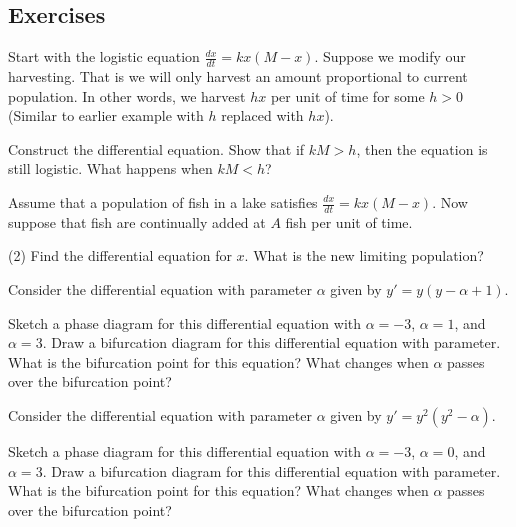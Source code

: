 \subsection{Exercises}

\begin{exercise}
Start with the logistic equation
$\frac{dx}{dt} = kx(M-x)$.
Suppose we modify our harvesting.  That is we will only harvest 
an amount proportional to current population.  In other words, we harvest $hx$
per unit of time
for some $h > 0$ (Similar to earlier example with $h$ replaced with $hx$).
\begin{tasks}
\task Construct the differential equation. 
\task Show that if $kM > h$, then
the equation is still logistic.
\task What happens when $kM < h$?
\end{tasks}
\end{exercise}

\begin{exercise}\ansMark
Assume that a population of fish in a lake satisfies
$\frac{dx}{dt} = kx(M-x)$.  Now suppose that fish are continually added
at $A$ fish per unit of time.
\begin{tasks}(2)
\task Find the differential equation for $x$.
\task What is the new limiting population?
\end{tasks}
\end{exercise}

\begin{exercise}
Consider the differential equation with parameter $\alpha$ given by $y' = y(y - \alpha + 1)$. 
\begin{tasks}
\task Sketch a phase diagram for this differential equation with $\alpha = -3$, $\alpha = 1$, and $\alpha = 3$. 
\task Draw a bifurcation diagram for this differential equation with parameter. 
\task What is the bifurcation point for this equation? What changes when $\alpha$ passes over the bifurcation point?
\end{tasks}
\end{exercise}

\begin{exercise}
Consider the differential equation with parameter $\alpha$ given by $y' = y^2(y^2 - \alpha)$. 
\begin{tasks}
\task Sketch a phase diagram for this differential equation with $\alpha = -3$, $\alpha = 0$, and $\alpha = 3$. 
\task Draw a bifurcation diagram for this differential equation with parameter. 
\task What is the bifurcation point for this equation? What changes when $\alpha$ passes over the bifurcation point?
\end{tasks}
\end{exercise}

